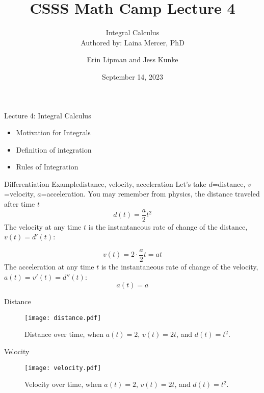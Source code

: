 \documentclass{beamer}
\begin{document}
\title[CSSS Math Camp - Lecture 4]{CSSS Math Camp Lecture 4}
\subtitle{Integral Calculus \\ \small{Authored by: Laina Mercer, PhD}}
\author{Erin Lipman and Jess Kunke}
\date{September 14, 2023}

\begin{frame}[plain] 
  \titlepage
\end{frame}



\begin{frame}{Lecture 4: Integral Calculus}

\begin{itemize}
\item Motivation for Integrals
\item Definition of integration
\item Rules of Integration
\end{itemize}

\end{frame}



\begin{frame}{Differentiation Example}{distance, velocity, acceleration}
Let's take $d$=distance, $v$=velocity, $a$=acceleration.  You may remember from physics, the distance traveled after time $t$
\[
d(t)=\frac{a}{2}t^2
\]
The velocity at any time $t$ is the instantaneous rate of change of the distance, $v(t)=d'(t)$:

\[
v(t)=2\cdot \frac{a}{2}t=at
\]
The acceleration at any time $t$ is the instantaneous rate of change of the velocity, $a(t)=v'(t)=d''(t)$:
\[
a(t)=a
\]
\end{frame}

\begin{frame}{Distance}
\begin{figure}[h!]\centering
    \texttt{[image: distance.pdf]}
    \caption{Distance over time, when $a(t)=2$, $v(t)=2t$, and $d(t)=t^2$.}
\end{figure}
\end{frame}

\begin{frame}{Velocity}
\begin{figure}[h!]\centering
    \texttt{[image: velocity.pdf]}
    \caption{Velocity over time, when $a(t)=2$, $v(t)=2t$, and $d(t)=t^2$.}
\end{figure}
\end{frame}
\end{document}
